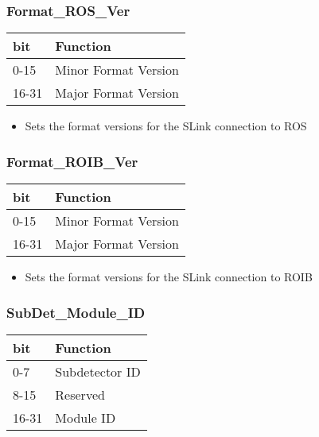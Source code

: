 \subsubsection{Format\_ROS\_Ver}

\begin {table}[H]
\begin{center}
\begin{tabular}{|l|l|}
\hline
\textbf{bit} & \textbf{Function} \\
\hline
0-15 & Minor Format Version \\
\hline
16-31 & Major Format Version \\
\hline
\end{tabular}
\end{center}
\end{table}


\begin{itemize}
\item Sets the format versions for the SLink connection to ROS
\end{itemize}



\subsubsection{Format\_ROIB\_Ver}

\begin {table}[H]
\begin{center}
\begin{tabular}{|l|l|}
\hline
\textbf{bit} & \textbf{Function} \\
\hline
0-15 & Minor Format Version \\
\hline
16-31 & Major Format Version \\
\hline
\end{tabular}
\end{center}
\end{table}


\begin{itemize}
\item Sets the format versions for the SLink connection to ROIB
\end{itemize}




\subsubsection{SubDet\_Module\_ID}

\begin {table}[H]
\begin{center}
\begin{tabular}{|l|l|}
\hline
\textbf{bit} & \textbf{Function} \\
\hline
0-7 & Subdetector ID \\
\hline
8-15 & Reserved \\
\hline
16-31 & Module ID \\
\hline
\end{tabular}
\end{center}
\end{table}


